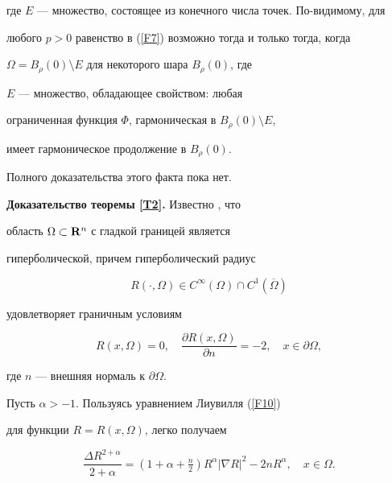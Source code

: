 где $E$ --- множество, состоящее из конечного числа точек. По-видимому, для


любого $p>0$ равенство в (\ref{F7}) возможно тогда и только тогда, когда


$\Omega=B_\rho (0)\setminus E$ для некоторого шара $B_\rho (0)$, где


$E$ --- множество, обладающее свойством: любая


ограниченная функция $\Phi $, гармоническая в $B_\rho (0)\setminus E$, 


имеет гармоническое продолжение в $B_\rho (0)$. 


Полного доказательства этого факта пока нет.


\medskip





{\bf Доказательство теоремы \ref{T2}.} Известно \cite{l13}, что


область $\Omega\subset {\bold R}^n$ с гладкой границей является


гиперболической, причем гиперболический радиус


$$


R(\cdot,\Omega)\in C^\infty (\Omega)\cap C^1(\overline{\Omega})


$$


удовлетворяет граничным условиям


\begin{equation} \label{F23}


R(x,\Omega)=0, \quad \frac{\partial R(x,\Omega)}{\partial n}=-2,


\quad x\in\partial\Omega,


\end{equation}


где $n$ --- внешняя нормаль к $\partial\Omega$.





Пусть $\alpha >-1$. Пользуясь уравнением Лиувилля (\ref{F10}) 


для функции $R=R(x,\Omega)$, легко получаем


\begin{equation} \label{F24}


\frac{\Delta R^{2+\alpha}}{2+\alpha}=


(1+\alpha+\tfrac{n}{2})R^\alpha |\nabla R|^2-


2nR^\alpha,   \quad    x\in\Omega.


\end{equation}



